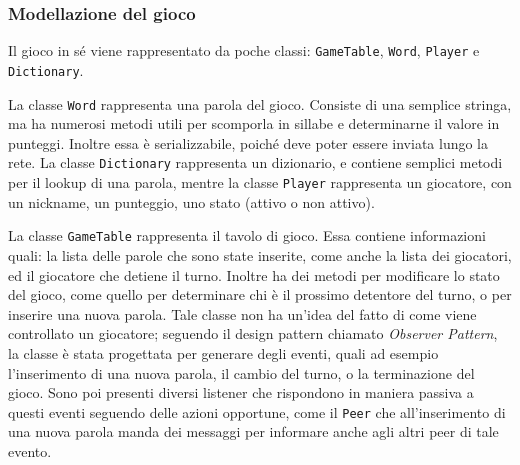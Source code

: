 \documentclass[10.5pt]{article}
\begin{document}
\subsubsection{Modellazione del gioco}

Il gioco in sé viene rappresentato da poche classi: \texttt{GameTable}, \texttt{Word}, \texttt{Player} e \texttt{Dictionary}.

La classe \texttt{Word} rappresenta una parola del gioco. Consiste di una semplice stringa, ma ha numerosi metodi utili per scomporla in sillabe e determinarne il valore in punteggi. Inoltre essa è serializzabile, poiché deve poter essere inviata lungo la rete. La classe \texttt{Dictionary} rappresenta un dizionario, e contiene semplici metodi per il lookup di una parola, mentre la classe \texttt{Player} rappresenta un giocatore, con un nickname, un punteggio, uno stato (attivo o non attivo).

La classe \texttt{GameTable} rappresenta il tavolo di gioco. Essa contiene informazioni quali: la lista delle parole che sono state inserite, come anche la lista dei giocatori, ed il giocatore che detiene il turno. Inoltre ha dei metodi per modificare lo stato del gioco, come quello per determinare chi è il prossimo detentore del turno, o per inserire una nuova parola. Tale classe non ha un'idea del fatto di come viene controllato un giocatore; seguendo il design pattern chiamato \textit{Observer Pattern}, la classe è stata progettata per generare degli eventi, quali ad esempio l'inserimento di una nuova parola, il cambio del turno, o la terminazione del gioco. Sono poi presenti diversi listener che rispondono in maniera passiva a questi eventi seguendo delle azioni opportune, come il \texttt{Peer} che all'inserimento di una nuova parola manda dei messaggi per informare anche agli altri peer di tale evento.
\end{document}
